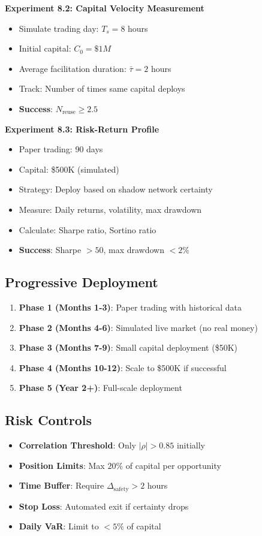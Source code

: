 \documentclass[12pt]{article}
\begin{document}
\textbf{Experiment 8.2: Capital Velocity Measurement}
\begin{itemize}
    \item Simulate trading day: $T_s = 8$ hours
    \item Initial capital: $C_0 = \$1M$
    \item Average facilitation duration: $\bar{\tau} = 2$ hours
    \item Track: Number of times same capital deploys
    \item \textbf{Success}: $N_{\text{reuse}} \geq 2.5$
\end{itemize}

\textbf{Experiment 8.3: Risk-Return Profile}
\begin{itemize}
    \item Paper trading: 90 days
    \item Capital: \$500K (simulated)
    \item Strategy: Deploy based on shadow network certainty
    \item Measure: Daily returns, volatility, max drawdown
    \item Calculate: Sharpe ratio, Sortino ratio
    \item \textbf{Success}: Sharpe $> 50$, max drawdown $< 2\%$
\end{itemize}

\subsection{Progressive Deployment}

\begin{enumerate}
    \item \textbf{Phase 1 (Months 1-3)}: Paper trading with historical data
    \item \textbf{Phase 2 (Months 4-6)}: Simulated live market (no real money)
    \item \textbf{Phase 3 (Months 7-9)}: Small capital deployment (\$50K)
    \item \textbf{Phase 4 (Months 10-12)}: Scale to \$500K if successful
    \item \textbf{Phase 5 (Year 2+)}: Full-scale deployment
\end{enumerate}

\subsection{Risk Controls}

\begin{itemize}
    \item \textbf{Correlation Threshold}: Only $|\rho| > 0.85$ initially
    \item \textbf{Position Limits}: Max $20\%$ of capital per opportunity
    \item \textbf{Time Buffer}: Require $\Delta_{\text{safety}} > 2$ hours
    \item \textbf{Stop Loss}: Automated exit if certainty drops
    \item \textbf{Daily VaR}: Limit to $< 5\%$ of capital
\end{itemize}
\end{document}
